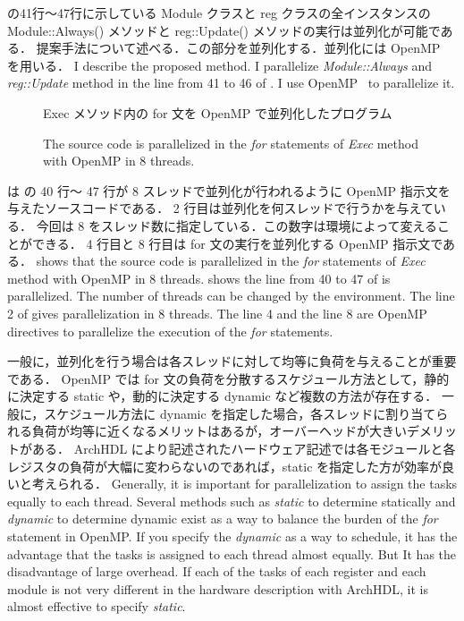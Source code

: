  の41行〜47行に示している Module クラスと reg クラスの全インスタンスの Module::Always() メソッドと reg::Update() メソッドの実行は並列化が可能である．
提案手法について述べる．この部分を並列化する．並列化には OpenMP~\cite{openmp} を用いる．
\fi
I describe the proposed method.
I parallelize \textit{Module::Always} and \textit{reg::Update} method in the line from 41 to 46 of .
I use OpenMP~\cite{openmp} to parallelize it.

\begin{figure}[t]
 
 \caption{Exec メソッド内の for 文を OpenMP で並列化したプログラム}
\fi
 \caption{The source code is parallelized in the \textit{for} statements of \textit{Exec} method with OpenMP in 8 threads.}
 \label{src:exec_openmp}
\end{figure}

 は の 40 行〜 47 行が 8 スレッドで並列化が行われるように OpenMP 指示文を与えたソースコードである．
2 行目は並列化を何スレッドで行うかを与えている．
今回は 8 をスレッド数に指定している．この数字は環境によって変えることができる．
4 行目と 8 行目は for 文の実行を並列化する OpenMP 指示文である．
\fi
{} shows that the source code is parallelized in the \textit{for} statements of \textit{Exec} method with OpenMP in 8 threads.
 shows the line from 40 to 47 of  is parallelized.
The number of threads can be changed by the environment.
The line 2 of  gives parallelization in 8 threads.
The line 4 and the line 8 are OpenMP directives to parallelize the execution of the \textit{for} statements.

一般に，並列化を行う場合は各スレッドに対して均等に負荷を与えることが重要である．
OpenMP では for 文の負荷を分散するスケジュール方法として，静的に決定する static や，動的に決定する dynamic など複数の方法が存在する．
一般に，スケジュール方法に dynamic を指定した場合，各スレッドに割り当てられる負荷が均等に近くなるメリットはあるが，オーバーヘッドが大きいデメリットがある．
ArchHDL により記述されたハードウェア記述では各モジュールと各レジスタの負荷が大幅に変わらないのであれば，static を指定した方が効率が良いと考えられる．
\fi
Generally, it is important for parallelization to assign the tasks equally to each thread.
Several methods such as \textit{static} to determine statically
and \textit{dynamic} to determine dynamic exist
as a way to balance the burden of the \textit{for} statement in OpenMP.
If you specify the \textit{dynamic} as a way to schedule,
it has the advantage that the tasks is assigned to each thread almost equally.
But It has the disadvantage of large overhead.
If each of the tasks of each register and each module is not very different in the hardware description with ArchHDL,
it is almost effective to specify \textit{static}.

